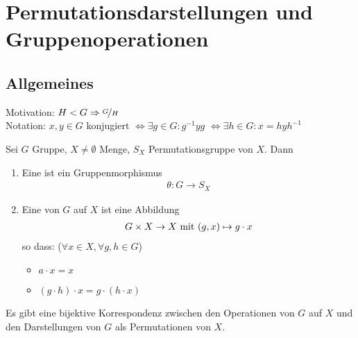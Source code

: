 \section{Permutationsdarstellungen und Gruppenoperationen}
\subsection*{Allgemeines}
Motivation: $H < G \implies \lnkset{G}{H}$\\
Notation: $x,y \in G$ konjugiert $\Leftrightarrow \exists g \in G \colon g^{-1}yg$ $\Leftrightarrow \exists h \in G\colon x = hyh^{-1}$
\begin{definition}
	Sei $G$ Gruppe, $X \neq \emptyset$ Menge, $S_X$ Permutationsgruppe von $X$. Dann
	\begin{enumerate}
		\item Eine  ist ein Gruppenmorphismus
		\begin{align*}
			\theta\colon G \to S_X
		\end{align*}
		\item Eine  von $G$ auf $X$ ist eine Abbildung
		\begin{align*}
			G\times X \to X \mit (g,x) \mapsto g\cdot x
		\end{align*}
		so dass: ($\forall x \in X, \forall g,h \in G$)
		\begin{itemize}
			\item $a \cdot x = x$
			\item $(g\cdot h)\cdot x = g \cdot (h\cdot x)$
		\end{itemize}
	\end{enumerate}
\end{definition}
\begin{proposition}
	Es gibt eine bijektive Korrespondenz zwischen den Operationen von $G$ auf $X$ und den Darstellungen von $G$ als Permutationen von $X$.
\end{proposition}
